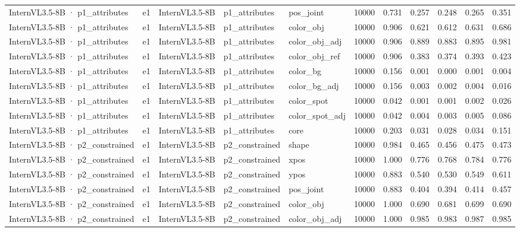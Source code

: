 \begin{tabular}{lllllrrrrrr}
InternVL3.5-8B · p1\_attributes & e1 & InternVL3.5-8B & p1\_attributes & pos\_joint & 10000 & 0.731 & 0.257 & 0.248 & 0.265 & 0.351 \\
InternVL3.5-8B · p1\_attributes & e1 & InternVL3.5-8B & p1\_attributes & color\_obj & 10000 & 0.906 & 0.621 & 0.612 & 0.631 & 0.686 \\
InternVL3.5-8B · p1\_attributes & e1 & InternVL3.5-8B & p1\_attributes & color\_obj\_adj & 10000 & 0.906 & 0.889 & 0.883 & 0.895 & 0.981 \\
InternVL3.5-8B · p1\_attributes & e1 & InternVL3.5-8B & p1\_attributes & color\_obj\_ref & 10000 & 0.906 & 0.383 & 0.374 & 0.393 & 0.423 \\
InternVL3.5-8B · p1\_attributes & e1 & InternVL3.5-8B & p1\_attributes & color\_bg & 10000 & 0.156 & 0.001 & 0.000 & 0.001 & 0.004 \\
InternVL3.5-8B · p1\_attributes & e1 & InternVL3.5-8B & p1\_attributes & color\_bg\_adj & 10000 & 0.156 & 0.003 & 0.002 & 0.004 & 0.016 \\
InternVL3.5-8B · p1\_attributes & e1 & InternVL3.5-8B & p1\_attributes & color\_spot & 10000 & 0.042 & 0.001 & 0.001 & 0.002 & 0.026 \\
InternVL3.5-8B · p1\_attributes & e1 & InternVL3.5-8B & p1\_attributes & color\_spot\_adj & 10000 & 0.042 & 0.004 & 0.003 & 0.005 & 0.086 \\
InternVL3.5-8B · p1\_attributes & e1 & InternVL3.5-8B & p1\_attributes & core & 10000 & 0.203 & 0.031 & 0.028 & 0.034 & 0.151 \\
InternVL3.5-8B · p2\_constrained & e1 & InternVL3.5-8B & p2\_constrained & shape & 10000 & 0.984 & 0.465 & 0.456 & 0.475 & 0.473 \\
InternVL3.5-8B · p2\_constrained & e1 & InternVL3.5-8B & p2\_constrained & xpos & 10000 & 1.000 & 0.776 & 0.768 & 0.784 & 0.776 \\
InternVL3.5-8B · p2\_constrained & e1 & InternVL3.5-8B & p2\_constrained & ypos & 10000 & 0.883 & 0.540 & 0.530 & 0.549 & 0.611 \\
InternVL3.5-8B · p2\_constrained & e1 & InternVL3.5-8B & p2\_constrained & pos\_joint & 10000 & 0.883 & 0.404 & 0.394 & 0.414 & 0.457 \\
InternVL3.5-8B · p2\_constrained & e1 & InternVL3.5-8B & p2\_constrained & color\_obj & 10000 & 1.000 & 0.690 & 0.681 & 0.699 & 0.690 \\
InternVL3.5-8B · p2\_constrained & e1 & InternVL3.5-8B & p2\_constrained & color\_obj\_adj & 10000 & 1.000 & 0.985 & 0.983 & 0.987 & 0.985 \\

\end{tabular}
